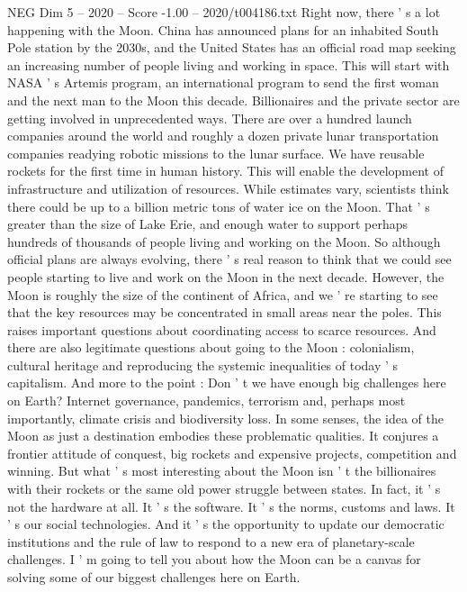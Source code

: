 \begin{textsample}{NEG Dim 5 – 2020 – Score -1.00 – 2020/t004186.txt}  \label{ex:f5_neg_020}
Right now, there ' s a lot happening with the Moon.
China has announced plans for an inhabited South Pole station by the 2030s, and the United States has an official road map seeking an increasing number of people living and working in space.
This will start with NASA ' s Artemis program, an international program to send the first woman and the next man to the Moon this decade.
Billionaires and the private sector are getting involved in unprecedented ways.
There are over a hundred launch companies around the world and roughly a dozen private lunar transportation companies readying robotic missions to the lunar surface.
We have reusable rockets for the first time in human history.
This will enable the development of infrastructure and utilization of resources.
While estimates vary, scientists think there could be up to a billion metric tons of water ice on the Moon.
That ' s greater than the size of Lake Erie, and enough water to support perhaps hundreds of thousands of people living and working on the Moon.
So although official plans are always evolving, there ' s real reason to think that we could see people starting to live and work on the Moon in the next decade.
However, the Moon is roughly the size of the continent of Africa, and we ' re starting to see that the key resources may be concentrated in small areas near the poles.
This raises important questions about coordinating access to scarce resources.
And there are also legitimate questions about going to the Moon : colonialism, cultural heritage and reproducing the systemic inequalities of today ' s capitalism.
And more to the point : Don ' t we have enough big challenges here on Earth?
Internet governance, pandemics, terrorism and, perhaps most importantly, climate crisis and biodiversity loss.
In some senses, the idea of the Moon as just a destination embodies these problematic qualities.
It conjures a frontier attitude of conquest, big rockets and expensive projects, competition and winning.
But what ' s most interesting about the Moon isn ' t the billionaires with their rockets or the same old power struggle between states.
In fact, it ' s not the hardware at all.
It ' s the software.
It ' s the norms, customs and laws.
It ' s our social technologies.
And it ' s the opportunity to update our democratic institutions and the rule of law to respond to a new era of planetary-scale challenges.
I ' m going to tell you about how the Moon can be a canvas for solving some of our biggest challenges here on Earth.

\end{textsample}
